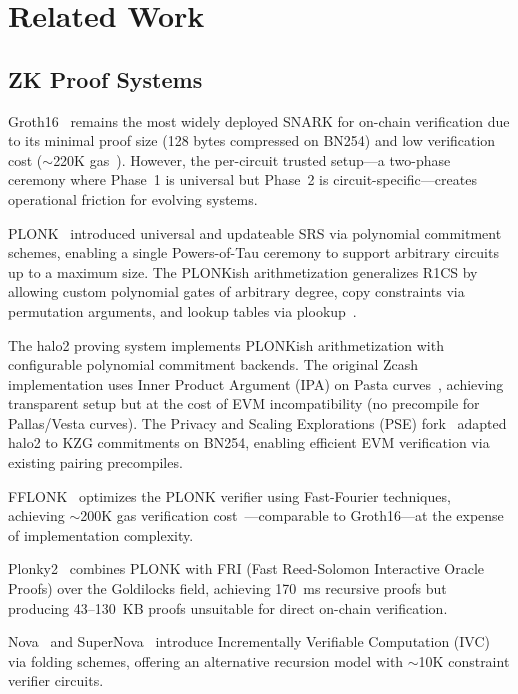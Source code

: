
\section{Related Work}
\label{sec:related}

\subsection{ZK Proof Systems}

Groth16~\cite{groth16} remains the most widely deployed SNARK for
on-chain verification due to its minimal proof size (128 bytes
compressed on BN254) and low verification cost ($\sim$220K
gas~\cite{nebra-gas}). However, the per-circuit trusted setup---a
two-phase ceremony where Phase~1 is universal but Phase~2 is
circuit-specific---creates operational friction for evolving systems.

PLONK~\cite{plonk} introduced universal and updateable SRS via
polynomial commitment schemes, enabling a single Powers-of-Tau
ceremony to support arbitrary circuits up to a maximum size. The
PLONKish arithmetization generalizes R1CS by allowing custom
polynomial gates of arbitrary degree, copy constraints via
permutation arguments, and lookup tables via
plookup~\cite{plookup,plonkup}.

The halo2 proving system implements PLONKish arithmetization with
configurable polynomial commitment backends. The original Zcash
implementation uses Inner Product Argument (IPA) on Pasta
curves~\cite{halo}, achieving transparent setup but at the cost of
EVM incompatibility (no precompile for Pallas/Vesta curves).
The Privacy and Scaling Explorations (PSE) fork~\cite{pse-halo2}
adapted halo2 to KZG commitments on BN254, enabling efficient EVM
verification via existing pairing precompiles.

FFLONK~\cite{fflonk} optimizes the PLONK verifier using
Fast-Fourier techniques, achieving $\sim$200K gas verification
cost~\cite{orbiter-gas}---comparable to Groth16---at the expense
of implementation complexity.

Plonky2~\cite{plonky2} combines PLONK with FRI (Fast Reed-Solomon
Interactive Oracle Proofs) over the Goldilocks field, achieving
170~ms recursive proofs but producing 43--130~KB proofs unsuitable
for direct on-chain verification.

Nova~\cite{nova} and SuperNova~\cite{supernova} introduce
Incrementally Verifiable Computation (IVC) via folding schemes,
offering an alternative recursion model with $\sim$10K constraint
verifier circuits.

